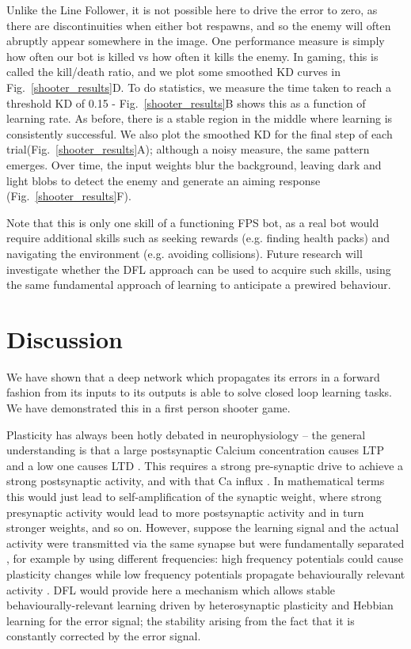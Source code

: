 \documentclass{article}
\begin{document}
Unlike the Line Follower, it is not possible here to drive the error
to zero, as there are discontinuities when either bot respawns, and so
the enemy will often abruptly appear somewhere in the image. One
performance measure is simply how often our bot is killed vs how often
it kills the enemy. In gaming, this is called the kill/death ratio,
and we plot some smoothed KD curves in Fig.~\ref{shooter_results}D. To
do statistics, we measure the time taken to reach a threshold KD of 0.15 -
Fig.~\ref{shooter_results}B shows this as a function of learning
rate. As before, there is a stable region in the middle where learning
is consistently successful. We also plot the smoothed KD for the final
step of each trial(Fig.~\ref{shooter_results}A); although a noisy
measure, the same pattern emerges. Over time, the input weights blur
the background, leaving dark and light blobs to detect the enemy and
generate an aiming response (Fig.~\ref{shooter_results}F).

Note that this is only one skill of a functioning FPS bot, as a real bot would
require additional skills such as seeking rewards (e.g. finding health packs) and
navigating the environment (e.g. avoiding collisions). Future research
will investigate whether the DFL approach can be used to acquire such
skills, using the same fundamental approach of learning to anticipate
a prewired behaviour.


\section{Discussion}
We have shown that a deep network which propagates its errors in a
forward fashion from its inputs to its outputs is able to solve closed
loop learning tasks. We have demonstrated this in a first person
shooter game.

Plasticity has always been hotly debated in neurophysiology -- the
general understanding is that a large postsynaptic Calcium
concentration causes LTP \cite{Malenka99,Bennett2000} and a low one
causes LTD \cite{Mulkey1992}. This requires a strong pre-synaptic
drive to achieve a strong postsynaptic activity, and with that Ca
influx \cite{Meunier2017}. In mathematical terms this would just lead
to self-amplification of the synaptic weight, where strong presynaptic
activity would lead to more postsynaptic activity and in turn stronger
weights, and so on. However, suppose the learning signal and the
actual activity were transmitted via the same synapse but were
fundamentally separated \cite{Lindsay2017}, for example by using
different frequencies: high frequency potentials could cause
plasticity changes while low frequency potentials propagate
behaviourally relevant activity \cite{Canolty2010}. DFL would provide
here a mechanism which allows stable behaviourally-relevant learning
driven by heterosynaptic plasticity and Hebbian learning for the error
signal; the stability arising from the fact that it is constantly
corrected by the error signal.
\end{document}
